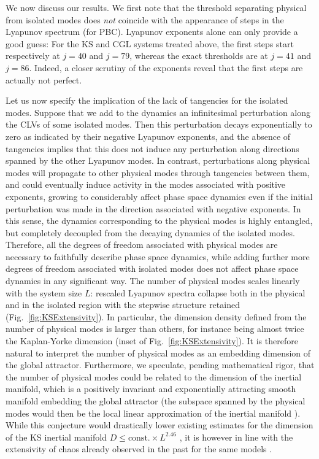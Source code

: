 \documentclass[prl,twocolumn,twoside,showpacs,superscriptaddress]{revtex4}
\begin{document}
We now discuss our results.
We first note that the threshold separating physical from isolated
modes does {\it not} coincide with the appearance of steps
in the Lyapunov spectrum (for PBC). 
Lyapunov exponents alone can only provide a good guess:
For the KS and CGL systems treated above,
the first steps start respectively at $j=40$ and $j=79$, whereas the 
exact thresholds are at  $j=41$ and $j=86$. Indeed, 
a closer scrutiny of the exponents reveal that the first steps are 
actually not perfect.

Let us now specify the implication of the lack of tangencies
 for the isolated modes.
Suppose that we add to the dynamics an infinitesimal perturbation 
along the CLVs of some isolated modes.
Then this perturbation decays exponentially to zero as indicated
 by their negative Lyapunov exponents,
 and the absence of tangencies implies that
 this does not induce any perturbation along directions spanned
 by the other Lyapunov modes.
In contrast, perturbations along physical modes will propagate to other physical modes
 through tangencies between them, and could eventually induce activity in the
 modes associated with positive exponents, growing to considerably affect phase space dynamics 
 even if the initial perturbation was made in the direction associated with negative exponents.
In this sense, the dynamics corresponding to the physical modes
 is highly entangled, but completely decoupled from
 the decaying dynamics of the isolated modes.
Therefore, all the degrees of freedom associated with physical modes are
 necessary to faithfully describe phase space dynamics, while adding further more degrees of
 freedom associated with isolated modes 
 does not affect phase space dynamics in any significant way.
The number of physical modes
 scales linearly with the system size $L$: rescaled Lyapunov spectra
 collapse both in the physical and in the isolated region with the 
 stepwise structure retained (Fig.~\ref{fig:KSExtensivity}). 
In particular, the dimension density defined from the number of physical modes is 
 larger than others, for instance being almost twice the Kaplan-Yorke dimension \cite{KY}
 (inset of Fig.~\ref{fig:KSExtensivity}). It is therefore natural to interpret the number of
 physical modes as an embedding dimension of the global attractor. 
Furthermore, we speculate, pending mathematical rigor, that the number of physical modes could be related 
 to the dimension of the inertial manifold, which is a positively invariant and
 exponentially attracting smooth manifold embedding the global attractor
(the subspace spanned by the physical modes would then be the local linear 
approximation of the inertial manifold \cite{IM2}).
While this conjecture would drastically lower existing estimates
 for the dimension of the KS inertial manifold
 $D \leq \text{const.} \times L^{2.46}$ \cite{IM2},
 it is however in line with
 the extensivity of chaos already observed in the past
 for the same models \cite{Manneville-LNP1985, Egolf}. 
\end{document}
